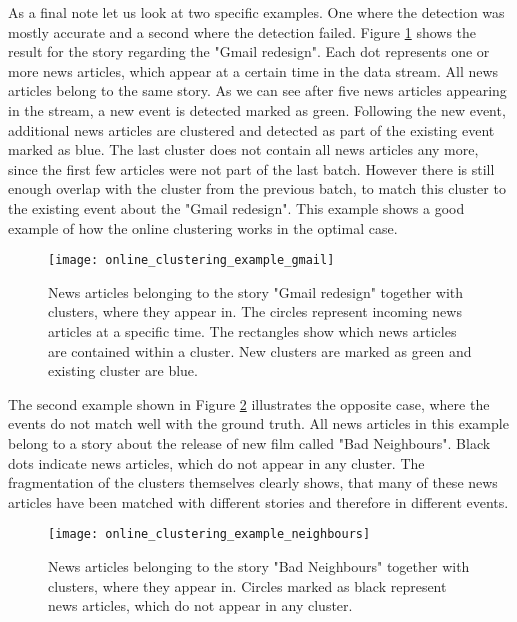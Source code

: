 As a final note let us look at two specific examples. One where the detection was mostly accurate and a second where the detection failed. Figure \ref{fig:online_clustering_example_gmail} shows the result for the story regarding the "Gmail redesign". Each dot represents one or more news articles, which appear at a certain time in the data stream. All news articles belong to the same story. As we can see after five news articles appearing in the stream, a new event is detected marked as green. Following the new event, additional news articles are clustered and detected as part of the existing event marked as blue. The last cluster does not contain all news articles any more, since the first few articles were not part of the last batch. However there is still enough overlap with the cluster from the previous batch, to match this cluster to the existing event about the "Gmail redesign". This example shows a good example of how the online clustering works in the optimal case.

\begin{figure}[h]
    \centering
    \texttt{[image: online\_clustering\_example\_gmail]}
    \caption{News articles belonging to the story "Gmail redesign" together with clusters, where they appear in. The circles represent incoming news articles at a specific time. The rectangles show which news articles are contained within a cluster. New clusters are marked as green and existing cluster are blue.}
    \label{fig:online_clustering_example_gmail}
\end{figure}

The second example shown in Figure \ref{fig:online_clustering_example_neighbours} illustrates the opposite case, where the events do not match well with the ground truth. All news articles in this example belong to a story about the release of new film called "Bad Neighbours". Black dots indicate news articles, which do not appear in any cluster. The fragmentation of the clusters themselves clearly shows, that many of these news articles have been matched with different stories and therefore in different events. 

\begin{figure}[h]
    \centering
    \texttt{[image: online\_clustering\_example\_neighbours]}
    \caption{News articles belonging to the story "Bad Neighbours" together with clusters, where they appear in. Circles marked as black represent news articles, which do not appear in any cluster.}
    \label{fig:online_clustering_example_neighbours}
\end{figure}


